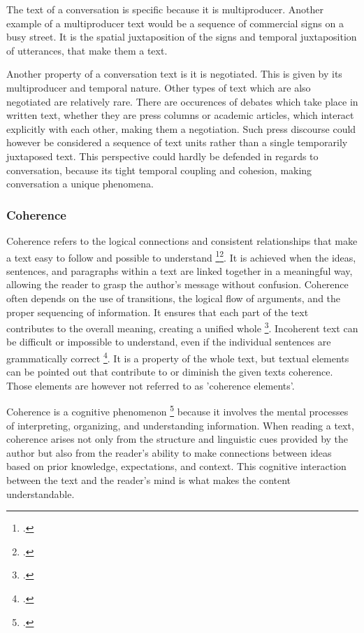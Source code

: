 \documentclass[12pt]{report}
\begin{document}
{\par
    The text of a conversation is specific because it is multiproducer.
    Another example of a multiproducer text
    would be a sequence of commercial signs on a busy street.
    It is the spatial juxtaposition of the signs and temporal juxtaposition of utterances,
    that make them a text.

    \par
    Another property of a conversation text is it is negotiated.
    This is given by its multiproducer and temporal nature.
    Other types of text which are also negotiated are relatively rare.
    There are occurences of debates which take place in written text,
    whether they are press columns or academic articles, which
    interact explicitly with each other, making them a negotiation.
    Such press discourse could however be considered
    a sequence of text units rather than a single temporarily juxtaposed text.
    This perspective could hardly be defended in regards to conversation, because
    its tight temporal coupling and cohesion,
    making conversation a unique phenomena.

\subsubsection{Coherence}
\par
    Coherence refers to the logical connections and consistent relationships that
    make a text easy to follow and possible to understand \footcite[p.~83]{givón2020coherence}\footcite[p.~9]{hrbacek1994}.
    It is achieved when the ideas, sentences, and paragraphs within a text are linked together in a meaningful way,
    allowing the reader to grasp the author's message without confusion.
    Coherence often depends on the use of transitions, the logical flow of arguments, and the proper sequencing of information.
    It ensures that each part of the text contributes to the overall meaning, creating a unified whole \footcite[p.~28]{hrbacek1994}.
    Incoherent text can be difficult or impossible to understand, even if the individual sentences are grammatically correct \footcite[p.~30]{hrbacek1994}.
    It is a property of the whole text, but
    textual elements can be pointed out that contribute to or diminish the given texts coherence.
    Those elements are however not referred to as 'coherence elements'.

\par
    Coherence is a cognitive phenomenon \footcite{Roberts01101993} because
    it involves the mental processes of interpreting, organizing, and understanding information.
    When reading a text,
    coherence arises not only from the structure and linguistic cues provided by the author but
    also from the reader's ability to
    make connections between ideas based on prior knowledge, expectations, and context.
    This cognitive interaction between the text and the reader’s mind is what makes the content understandable.

}
\end{document}
